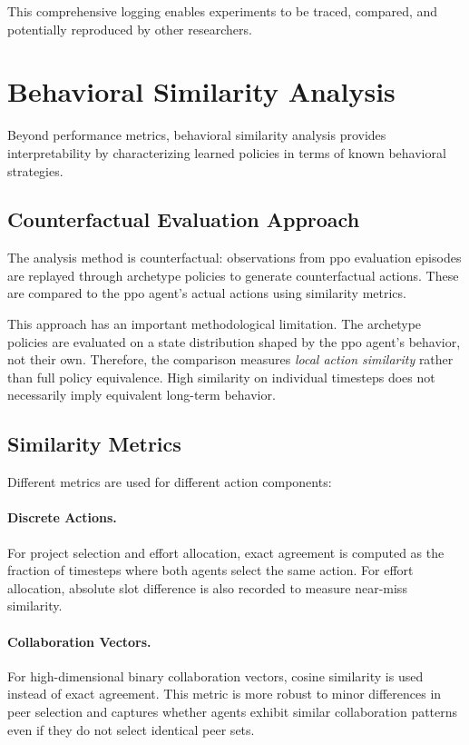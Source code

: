 \documentclass[english,bachelor]{hsluthesis}
\begin{document}
This comprehensive logging enables experiments to be traced, compared, and potentially reproduced by other researchers.


\section{Behavioral Similarity Analysis}

Beyond performance metrics, behavioral similarity analysis provides interpretability by characterizing learned policies in terms of known behavioral strategies.

\subsection{Counterfactual Evaluation Approach}

The analysis method is counterfactual: observations from \gls{ppo} evaluation episodes are replayed through archetype policies to generate counterfactual actions. These are compared to the \gls{ppo} agent's actual actions using similarity metrics.

This approach has an important methodological limitation. The archetype policies are evaluated on a state distribution shaped by the \gls{ppo} agent's behavior, not their own. Therefore, the comparison measures \emph{local action similarity} rather than full policy equivalence. High similarity on individual timesteps does not necessarily imply equivalent long-term behavior.

\subsection{Similarity Metrics}

Different metrics are used for different action components:

\paragraph{Discrete Actions.}
For project selection and effort allocation, exact agreement is computed as the fraction of timesteps where both agents select the same action. For effort allocation, absolute slot difference is also recorded to measure near-miss similarity.

\paragraph{Collaboration Vectors.}
For high-dimensional binary collaboration vectors, cosine similarity is used instead of exact agreement. This metric is more robust to minor differences in peer selection and captures whether agents exhibit similar collaboration patterns even if they do not select identical peer sets.
\end{document}
